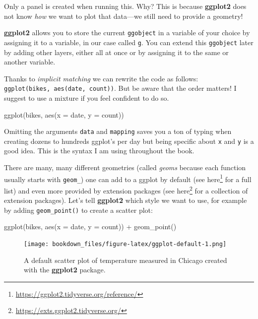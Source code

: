 \documentclass[
]{krantz}
\makeatletter
\newenvironment{Shaded}{\begin{snugshade}}{\end{snugshade}}
\newcommand{\AttributeTok}[1]{\textcolor[rgb]{0.61,0.61,0.61}{#1}}
\newcommand{\FunctionTok}[1]{\textcolor[rgb]{0,0,0}{#1}}
\newcommand{\NormalTok}[1]{#1}
\newcommand{\SpecialCharTok}[1]{\textcolor[rgb]{0,0,0}{#1}}
\renewcommand{\href}[2]{#2\footnote{\url{#1}}}
\newenvironment{kframe}{%
\medskip{}
\setlength{\fboxsep}{.8em}
 \def\at@end@of@kframe{}%
 \ifinner\ifhmode%
  \def\at@end@of@kframe{\end{minipage}}%
  \begin{minipage}{\columnwidth}%
 \fi\fi%
 \def\FrameCommand##1{\hskip\@totalleftmargin \hskip-\fboxsep
 \colorbox{shadecolor}{##1}\hskip-\fboxsep
     \hskip-\linewidth \hskip-\@totalleftmargin \hskip\columnwidth}%
 \MakeFramed {\advance\hsize-\width
   \@totalleftmargin\z@ \linewidth\hsize
   \@setminipage}}%
 {\par\unskip\endMakeFramed%
 \at@end@of@kframe}
\renewenvironment{Shaded}{\begin{kframe}}{\end{kframe}}
\makeatother
\begin{document}
Only a panel is created when running this. Why? This is because \textbf{ggplot2} does not know \emph{how} we want to plot that data---we still need to provide a geometry!

\textbf{ggplot2} allows you to store the current \texttt{ggobject} in a variable of your choice by assigning it to a variable, in our case called \texttt{g}. You can extend this \texttt{ggobject} later by adding other layers, either all at once or by assigning it to the same or another variable.

Thanks to \emph{implicit matching} we can rewrite the code as follows: \texttt{ggplot(bikes,\ aes(date,\ count))}. But be aware that the order matters! I suggest to use a mixture if you feel confident to do so.

\begin{Shaded}
\begin{Highlighting}[]
\FunctionTok{ggplot}\NormalTok{(bikes, }\FunctionTok{aes}\NormalTok{(}\AttributeTok{x =}\NormalTok{ date, }\AttributeTok{y =}\NormalTok{ count))}
\end{Highlighting}
\end{Shaded}

Omitting the arguments \texttt{data} and \texttt{mapping} saves you a ton of typing when creating dozens to hundreds ggplot's per day but being specific about \texttt{x} and \texttt{y} is a good idea. This is the syntax I am using throughout the book.

There are many, many different geometries (called \emph{geoms} because each function usually starts with \texttt{geom\_}) one can add to a ggplot by default (see \href{https://ggplot2.tidyverse.org/reference/}{here} for a full list) and even more provided by extension packages (see \href{https://exts.ggplot2.tidyverse.org/}{here} for a collection of extension packages). Let's tell \textbf{ggplot2} which style we want to use, for example by adding \texttt{geom\_point()} to create a scatter plot:

\begin{Shaded}
\begin{Highlighting}[]
\FunctionTok{ggplot}\NormalTok{(bikes, }\FunctionTok{aes}\NormalTok{(}\AttributeTok{x =}\NormalTok{ date, }\AttributeTok{y =}\NormalTok{ count)) }\SpecialCharTok{+} 
  \FunctionTok{geom\_point}\NormalTok{()}
\end{Highlighting}
\end{Shaded}

\begin{figure}
\centering
\texttt{[image: bookdown\_files/figure-latex/ggplot-default-1.png]}
\caption{\label{fig:ggplot-default}A default scatter plot of temperature measured in Chicago created with the \textbf{ggplot2} package.}
\end{figure}
\end{document}
